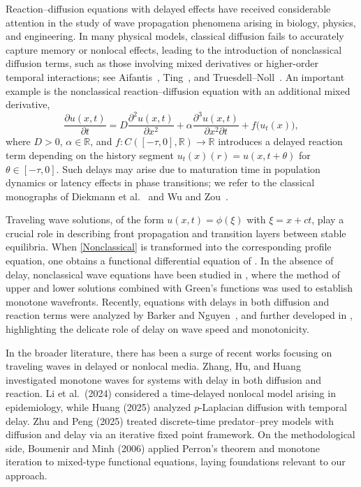 \documentclass[12pt,letterpaper]{amsart}
\theoremstyle{definition}
\theoremstyle{remark}
\numberwithin{equation}{section}
\begin{document}
 Reaction--diffusion equations with delayed effects have received considerable attention 
 in the study of wave propagation phenomena arising in biology, physics, and engineering. 
 In many physical models, classical diffusion fails to accurately capture memory or nonlocal 
 effects, leading to the introduction of nonclassical diffusion terms, such as those involving 
 mixed derivatives or higher-order temporal interactions; see 
 Aifantis~\cite{Aifantis}, Ting~\cite{Ting}, and Truesdell--Noll~\cite{Truesdell}. 
 An important example is the nonclassical reaction--diffusion equation
 with an additional mixed derivative,
 \begin{equation}\label{Nonclassical}
 	\frac{\partial u(x,t)}{\partial t}
 	= D \frac{\partial^2 u(x,t)}{\partial x^2}
 	+ \alpha \frac{\partial^3 u(x,t)}{\partial x^2 \partial t}
 	+ f\big(u_t(x)\big),
 \end{equation}
 where $D>0$, $\alpha\in\mathbb{R}$, and $f:C([-\tau,0],\mathbb{R})\to\mathbb{R}$ 
 introduces a delayed reaction term depending on the history segment
 $u_t(x)(r)=u(x,t+\theta)$ for $\theta\in[-\tau,0]$. Such delays may arise due to maturation time 
 in population dynamics or latency effects in phase transitions; 
 we refer to the classical monographs of Diekmann et al.~\cite{Diekmann} and Wu and Zou~\cite{wuzou}.
 
 Traveling wave solutions, of the form $u(x,t)=\phi(\xi)$ with $\xi=x+ct$, 
 play a crucial role in describing front propagation and transition layers 
 between stable equilibria. When \eqref{Nonclassical} is transformed into 
 the corresponding profile equation, one obtains a functional differential 
 equation of . In the absence of delay, nonclassical wave equations 
 have been studied in \cite{Bark}, where the method of upper and lower solutions 
 combined with Green’s functions was used to establish monotone wavefronts.
 Recently, equations with delays in both diffusion and reaction terms were 
 analyzed by Barker and Nguyen~\cite{BarkNguy}, and further developed in 
 \cite{BarkNguyTha1,BarkNguyTha2,Zhang2025}, highlighting the delicate role of delay 
 on wave speed and monotonicity.
 
 In the broader literature, there has been a surge of recent works focusing on 
 traveling waves in delayed or nonlocal media. Zhang, Hu, and Huang~\cite{Zhang2025} 
 investigated monotone waves for systems with delay in both diffusion and reaction. 
 Li et al.~(2024) considered a time-delayed nonlocal model arising in epidemiology, 
 while Huang (2025) analyzed $p$-Laplacian diffusion with temporal delay. 
 Zhu and Peng (2025) treated discrete-time predator--prey models with diffusion 
 and delay via an iterative fixed point framework. On the methodological side, 
 Boumenir and Minh (2006) applied Perron’s theorem and monotone iteration 
 to mixed-type functional equations, laying foundations relevant to our approach.
 
\end{document}
